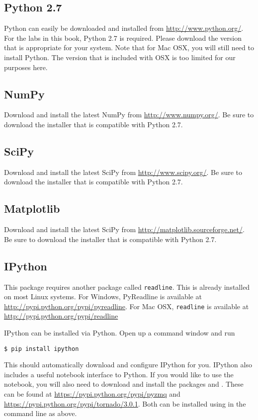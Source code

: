 \subsection*{Python 2.7}
Python can easily be downloaded and installed from \url{http://www.python.org/}.  
For the labs in this book, Python 2.7 is required.
Please download the version that is appropriate for your system.  
Note that for Mac OSX, you will still need to install Python.
The version that is included with OSX is too limited for our purposes here.

\subsection*{NumPy}
Download and install the latest NumPy from \url{http://www.numpy.org/}.  
Be sure to download the installer that is compatible with Python 2.7.

\subsection*{SciPy}
Download and install the latest SciPy from \url{http://www.scipy.org/}. 
Be sure to download the installer that is compatible with Python 2.7.

\subsection*{Matplotlib}
Download and install the latest SciPy from \url{http://matplotlib.sourceforge.net/}.
Be sure to download the installer that is compatible with Python 2.7.

\subsection*{IPython}
This package requires another package called \texttt{readline}.
This is already installed on most Linux systems. 
For Windows, PyReadline is available at \url{http://pypi.python.org/pypi/pyreadline}.
For Mac OSX, \texttt{readline} is available at \url{http://pypi.python.org/pypi/readline}

IPython can be installed via Python.
Open up a command window and run
\begin{lstlisting}
$ pip install ipython
\end{lstlisting}
This should automatically download and configure IPython for you.
IPython also includes a useful notebook interface to Python.
If you would like to use the notebook, you will also need to download and install the packages  and .
These can be found at \url{https://pypi.python.org/pypi/pyzmq} and \url{https://pypi.python.org/pypi/tornado/3.0.1}.
Both can be installed using  in the command line as above.


